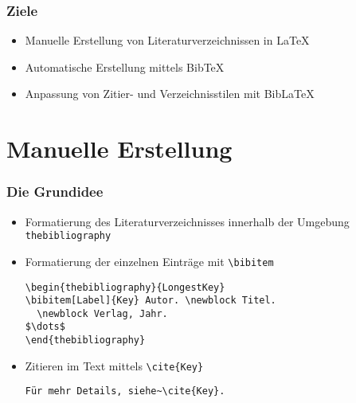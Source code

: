 \begin{frame}
  \frametitle{Ziele}
  \onslide<+->

  \begin{itemize}
  \item<+-> Manuelle Erstellung von Literaturverzeichnissen in \LaTeX
  \item<+-> Automatische Erstellung mittels Bib\TeX
  \item<+-> Anpassung von Zitier- und Verzeichnisstilen mit Bib\LaTeX
  \end{itemize}

\end{frame}

\section{Manuelle Erstellung}

\begin{frame}[fragile]
  \frametitle{Die Grundidee}
  \onslide<+->

  \begin{itemize}
  \item<+-> Formatierung des Literaturverzeichnisses innerhalb der Umgebung
    \lstinline|thebibliography|%
  \item<+-> Formatierung der einzelnen Einträge mit \lstinline|\bibitem|
    \onslide<+->
\begin{lstlisting}
\begin{thebibliography}{LongestKey}
\bibitem[Label]{Key} Autor. \newblock Titel.
  \newblock Verlag, Jahr.
$\dots$
\end{thebibliography}
\end{lstlisting}
  \item<+-> Zitieren im Text mittels \lstinline|\cite{Key}|\onslide<+->%
\begin{lstlisting}
Für mehr Details, siehe~\cite{Key}.
\end{lstlisting}
  \end{itemize}

\end{frame}

